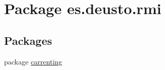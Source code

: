 \hypertarget{namespacees_1_1deusto_1_1rmi}{}\section{Package es.\+deusto.\+rmi}
\label{namespacees_1_1deusto_1_1rmi}
\subsection*{Packages}
\begin{DoxyCompactItemize}
\item 
package \mbox{\hyperlink{namespacees_1_1deusto_1_1rmi_1_1carrenting}{carrenting}}
\end{DoxyCompactItemize}
